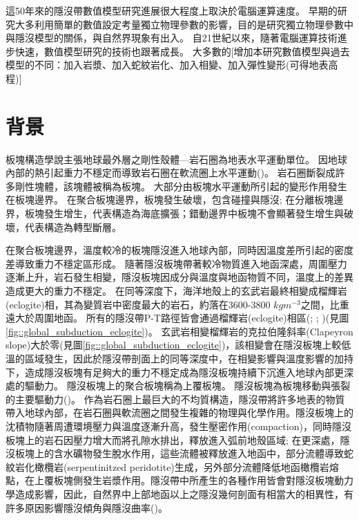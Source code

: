 這50年來的隱沒帶數值模型研究進展很大程度上取決於電腦運算速度。
早期的研究大多利用簡單的數值設定考量獨立物理參數的影響，目的是研究獨立物理參數中與隱沒模型的關係，與自然界現象有出入。
自21世紀以來，隨著電腦運算技術進步快速，數值模型研究的技術也跟著成長。
大多數的[增加本研究數值模型與過去模型的不同：加入岩漿、加入蛇紋岩化、加入相變、加入彈性變形(可得地表高程)]

\section{背景}

板塊構造學說主張地球最外層之剛性殼體---岩石圈為地表水平運動單位。
因地球內部的熱引起重力不穩定而導致岩石圈在軟流圈上水平運動(\citealp{jordan1978composition})。
岩石圈斷裂成許多剛性塊體，該塊體被稱為板塊。
大部分由板塊水平運動所引起的變形作用發生在板塊邊界。
在聚合板塊邊界，板塊發生破壞，包含碰撞與隱沒; 在分離板塊邊界，板塊發生增生，代表構造為海底擴張；錯動邊界中板塊不會顯著發生增生與破壞，代表構造為轉型斷層。

在聚合板塊邊界，溫度較冷的板塊隱沒進入地球內部，同時因溫度差所引起的密度差導致重力不穩定區形成。
隨著隱沒板塊帶著較冷物質進入地函深處，周圍壓力逐漸上升，岩石發生相變，隱沒板塊因成分與溫度與地函物質不同，溫度上的差異造成更大的重力不穩定。
在同等深度下，海洋地殼上的玄武岩最終相變成榴輝岩(eclogite)相，其為變質岩中密度最大的岩石，約落在3600-3800 $kg m^{-3}$之間，比重遠大於周圍地函。
所有的隱沒帶P-T路徑皆會通過榴輝岩(eclogite)相區(\citealp{gerya2002exhumation}; \citealp{syracuse2010global}; \citealp{penniston2015global})(見圖\ref{fig::global_subduction_eclogite})。
玄武岩相變榴輝岩的克拉伯隆斜率(Clapeyron slope)大於零(見圖\ref{fig::global_subduction_eclogite})，該相變會在隱沒板塊上較低溫的區域發生，因此於隱沒帶剖面上的同等深度中，在相變影響與溫度影響的加持下，造成隱沒板塊有足夠大的重力不穩定成為隱沒板塊持續下沉進入地球內部更深處的驅動力。
隱沒板塊上的聚合板塊稱為上覆板塊。
隱沒板塊為板塊移動與張裂的主要驅動力(\citealp{turcotte2002geodynamics})。
作為岩石圈上最巨大的不均質構造，隱沒帶將許多地表的物質帶入地球內部，在岩石圈與軟流圈之間發生複雜的物理與化學作用。隱沒板塊上的沈積物隨著周遭環境壓力與溫度逐漸升高，發生壓密作用(compaction)，同時隱沒板塊上的岩石因壓力增大而將孔隙水排出，釋放進入弧前地殼區域; 在更深處，隱沒板塊上的含水礦物發生脫水作用，這些流體被釋放進入地函中，部分流體導致蛇紋岩化橄欖岩(serpentinitzed peridotite)生成，另外部分流體降低地函橄欖岩熔點，在上覆板塊側發生岩漿作用。隱沒帶中所產生的各種作用皆會對隱沒板塊動力學造成影響，因此，自然界中上部地函以上之隱沒幾何剖面有相當大的相異性，有許多原因影響隱沒傾角與隱沒曲率(\citealp{schellart2020control})。

